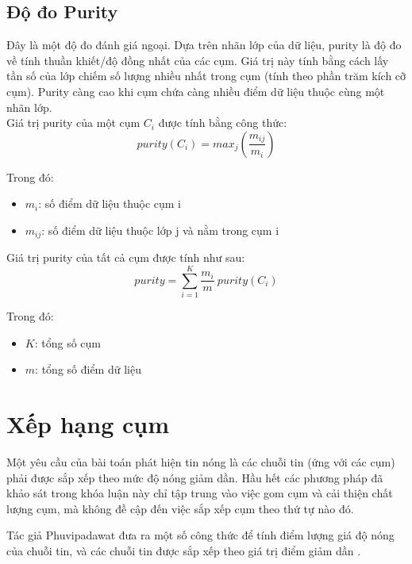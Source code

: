 	\subsection{Độ đo Purity}
	Đây là một độ đo đánh giá ngoại. Dựa trên nhãn lớp của dữ liệu, purity là độ đo về tính thuần khiết/độ đồng nhất của các cụm. Giá trị này tính bằng cách lấy tần số của lớp chiếm số lượng nhiều nhất trong cụm (tính theo phần trăm kích cỡ cụm). Purity càng cao khi cụm chứa càng nhiều điểm dữ liệu thuộc cùng một nhãn lớp.\\
	
	Giá trị purity của một cụm $C_i$ được tính bằng công thức:
	\begin{equation}
	purity(C_i) = max_j( \frac{m_{ij}}{m_i})
	\end{equation}
	
	Trong đó:
	\begin{itemize}
		\item $m_i$: số điểm dữ liệu thuộc cụm i
		\item $m_{ij}$: số điểm dữ liệu thuộc lớp j và nằm trong cụm i
	\end{itemize}
	
	Giá trị purity của tất cả cụm được tính như sau:
	\begin{equation}
	purity = \sum_{i=1}^{K} \frac{m_i}{m} \ purity(C_i)
	\end{equation}
	
	Trong đó:
	\begin{itemize}
		\item $K$: tổng số cụm
		\item $m$: tổng số điểm dữ liệu
	\end{itemize}
	
\section{Xếp hạng cụm}
	Một yêu cầu của bài toán phát hiện tin nóng là các chuỗi tin (ứng với các cụm) phải được sắp xếp theo mức độ nóng giảm dần. Hầu hết các phương pháp đã khảo sát trong khóa luận này chỉ tập trung vào việc gom cụm và cải thiện chất lượng cụm, mà không đề cập đến việc sắp xếp cụm theo thứ tự nào đó. 
	
	Tác giả Phuvipadawat đưa ra một số công thức để tính điểm lượng giá độ nóng của chuỗi tin, và các chuỗi tin được sắp xếp theo giá trị điểm giảm dần \cite{SwitPhuvipadawat}.
	
	
